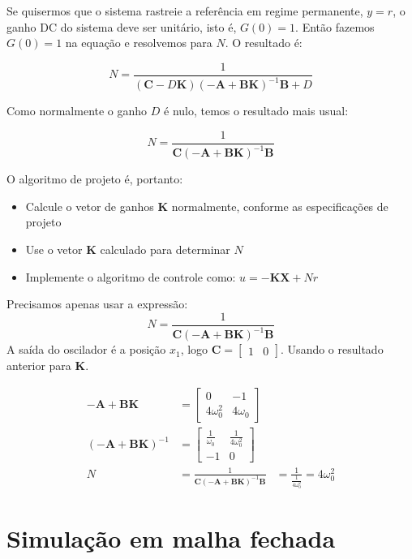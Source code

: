 \documentclass[
]{book}
\providecommand{\tightlist}{%
  \setlength{\itemsep}{0pt}\setlength{\parskip}{0pt}}
\begin{document}
Se quisermos que o sistema rastreie a referência em regime
permanente, \(y=r\), o ganho DC do sistema deve ser unitário, isto é,
\(G(0)=1\). Então fazemos \(G(0)=1\) na equação e resolvemos para \(N\). O
resultado é:

\[
  N = \frac{1}{(\mathbf{C}-D\mathbf{K})(\mathbf{-A+BK})^{-1}\mathbf{B}+D}
\]

Como normalmente o ganho \(D\) é nulo, temos o resultado mais usual:

\[
  N = \frac{1}{\mathbf{C}(\mathbf{-A+BK})^{-1}\mathbf{B}}
\]

O algoritmo de projeto é, portanto:

\begin{itemize}
\tightlist
\item
  Calcule o vetor de ganhos \(\mathbf{K}\) normalmente, conforme as
  especificações de projeto
\item
  Use o vetor \(\mathbf{K}\) calculado para determinar \(N\)
\item
  Implemente o algoritmo de controle como: \(u=-\mathbf{KX}+Nr\)
\end{itemize}


Precisamos apenas usar a expressão:
\[
  N = \frac{1}{\mathbf{C}(\mathbf{-A+BK})^{-1}\mathbf{B}}
\]
A saída do oscilador é a posição \(x_1\), logo \(\mathbf{C} = \begin{bmatrix}1 & 0\end{bmatrix}\). Usando o resultado anterior para \(\mathbf{K}\).

\begin{align}
  \mathbf{-A+BK} &= \left[\begin{matrix}0 & -1\\4 \omega_{0}^{2} & 4 \omega_{0}\end{matrix}\right] \\
  (\mathbf{-A+BK})^{-1} &= \left[\begin{matrix}\frac{1}{\omega_{0}} & \frac{1}{4 \omega_{0}^{2}}\\-1 & 0\end{matrix}\right]\\
  N &= \frac{1}{\mathbf{C}(\mathbf{-A+BK})^{-1}\mathbf{B}} &= \frac{1}{\frac{1}{4 \omega_{0}^{2}}} = 4 \omega_{0}^{2}
\end{align}

\hypertarget{simulauxe7uxe3o-em-malha-fechada}{%
\section{Simulação em malha fechada}\label{simulauxe7uxe3o-em-malha-fechada}}
\end{document}
